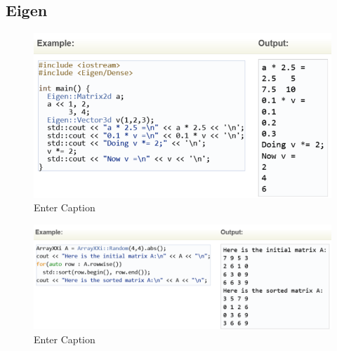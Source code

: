 \documentclass[a4paper,10pt]{article}
\begin{document}
\subsection{Eigen}
\begin{figure}[h]
    \centering
    \includegraphics[width=1\linewidth]{e20.png}
    \caption{Enter Caption}
    \label{fig:enter-label}
\end{figure}
\begin{figure}
    \centering
    \includegraphics[width=1\linewidth]{e21.png}
    \caption{Enter Caption}
    \label{fig:enter-label}
\end{figure}
\end{document}
